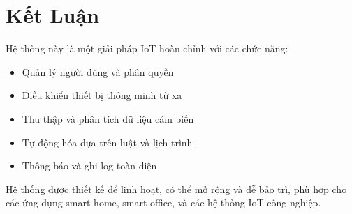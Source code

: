 \documentclass[12pt,a4paper]{article}
\begin{document}
\section{Kết Luận}

Hệ thống này là một giải pháp IoT hoàn chỉnh với các chức năng:
\begin{itemize}
    \item Quản lý người dùng và phân quyền
    \item Điều khiển thiết bị thông minh từ xa
    \item Thu thập và phân tích dữ liệu cảm biến
    \item Tự động hóa dựa trên luật và lịch trình
    \item Thông báo và ghi log toàn diện
\end{itemize}

Hệ thống được thiết kế để linh hoạt, có thể mở rộng và dễ bảo trì, phù hợp cho các ứng dụng smart home, smart office, và các hệ thống IoT công nghiệp.
\end{document}
